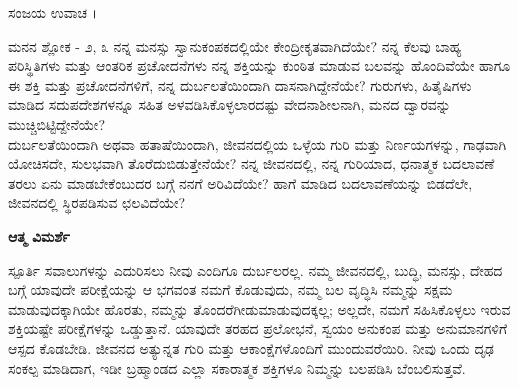 ಸಂಜಯ ಉವಾಚ ।\\

\newpage
\begin{mananam}{\mananamfont \large \large{ಮನನ ಶ್ಲೋಕ - ೨, ೩}}
\footnotesize \mananamtext ನನ್ನ ಮನಸ್ಸು ಸ್ವಾನುಕಂಪಕದಲ್ಲಿಯೇ ಕೇಂದ್ರೀಕೃತವಾಗಿದೆಯೇ? ನನ್ನ ಕೆಲವು ಬಾಹ್ಯ ಪರಿಸ್ಥಿತಿಗಳು ಮತ್ತು ಆಂತರಿಕ ಪ್ರಚೋದನೆಗಳು ನನ್ನ ಶಕ್ತಿಯನ್ನು ಕುಂಠಿತ ಮಾಡುವ ಬಲವನ್ನು ಹೊಂದಿವೆಯೇ ಹಾಗೂ ಈ ಶಕ್ತಿ ಮತ್ತು ಪ್ರಚೋದನೆಗಳಿಗೆ, ನನ್ನ ದುರ್ಬಲತೆಯಿಂದಾಗಿ ದಾಸನಾಗಿದ್ದೇನೆಯೇ? ಗುರುಗಳು, ಹಿತೈಷಿಗಳು ಮಾಡಿದ ಸದುಪದೇಶಗಳನ್ನೂ ಸಹಿತ ಅಳವಡಿಸಿಕೊಳ್ಳಲಾರದಷ್ಟು ವೇದನಾಶೀಲನಾಗಿ, ಮನದ ದ್ವಾರವನ್ನು ಮುಚ್ಚಿಬಿಟ್ಟಿದ್ದೇನೆಯೇ?\\
ದುರ್ಬಲತೆಯಿಂದಾಗಿ ಅಥವಾ ಹತಾಷೆಯಿಂದಾಗಿ, ಜೀವನದಲ್ಲಿಯ ಒಳ್ಳೆಯ ಗುರಿ ಮತ್ತು ನಿರ್ಣಯಗಳನ್ನು, ಗಾಢವಾಗಿ ಯೋಚಿಸದೇ, ಸುಲಭವಾಗಿ ತೊರೆದುಬಿಡುತ್ತೇನೆಯೇ? ನನ್ನ ಜೀವನದಲ್ಲಿ, ನನ್ನ ಗುರಿಯಾದ, ಧನಾತ್ಮಕ ಬದಲಾವಣೆ ತರಲು ಏನು ಮಾಡಬೇಕೆಂಬುದರ ಬಗ್ಗೆ ನನಗೆ ಅರಿವಿದೆಯೇ? ಹಾಗೆ ಮಾಡಿದ ಬದಲಾವಣೆಯನ್ನು ಬಿಡದೆಲೇ, ಜೀವನದಲ್ಲಿ ಸ್ಥಿರಪಡಿಸುವ ಛಲವಿದೆಯೇ?
\end{mananam}
\WritingHand\enspace\textbf{ಆತ್ಮ ವಿಮರ್ಶೆ}\\
\begin{inspiration}{\mananamfont \large \large ಸ್ಪೂರ್ತಿ}
\footnotesize \mananamtext ಸವಾಲುಗಳನ್ನು ಎದುರಿಸಲು ನೀವು ಎಂದಿಗೂ ದುರ್ಬಲರಲ್ಲ. ನಮ್ಮ ಜೀವನದಲ್ಲಿ,  ಬುದ್ಧಿ, ಮನಸ್ಸು, ದೇಹದ ಬಗ್ಗೆ ಯಾವುದೇ ಪರೀಕ್ಷೆಯನ್ನು ಆ ಭಗವಂತ ನಮಗೆ ಕೊಡುವುದು, ನಮ್ಮ ಬಲ ವೃದ್ಧಿಸಿ ನಮ್ಮನ್ನು ಸಕ್ಷಮ ಮಾಡುವುದಕ್ಕಾಗಿಯೇ ಹೊರತು,  ನಮ್ಮನ್ನು ತೊಂದರೆಗೀಡುಮಾಡುವುದಕ್ಕಲ್ಲ; ಅಲ್ಲದೇ, ನಮಗೆ ಸಹಿಸಿಕೊಳ್ಳಲು ಇರುವ ಶಕ್ತಿಯಷ್ಟೇ ಪರೀಕ್ಷೆಗಳನ್ನು ಒಡ್ಡುತ್ತಾನೆ. ಯಾವುದೇ ತರಹದ ಪ್ರಲೋಭನೆ, ಸ್ವಯಂ ಅನುಕಂಪ ಮತ್ತು ಅನುಮಾನಗಳಿಗೆ ಆಸ್ಪದ ಕೊಡಬೇಡಿ. ಜೀವನದ ಅತ್ಯುನ್ನತ ಗುರಿ ಮತ್ತು ಆಕಾಂಕ್ಷೆಗಳೊಂದಿಗೆ ಮುಂದುವರೆಯಿರಿ. ನೀವು ಒಂದು ದೃಢ ಸಂಕಲ್ಪ ಮಾಡಿದಾಗ, ಇಡೀ ಬ್ರಹ್ಮಾಂಡದ ಎಲ್ಲಾ ಸಕಾರಾತ್ಮಕ ಶಕ್ತಿಗಳೂ ನಿಮ್ಮನ್ನು ಬಲಪಡಿಸಿ ಬೆಂಬಲಿಸುತ್ತವೆ.
\end{inspiration}
\newpage

